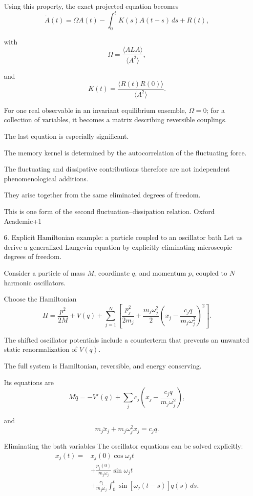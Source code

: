 Using this property, the exact projected equation becomes
\[
\boxed{
\dot A(t)
=
\Omega A(t)
-\int_0^t K(s)A(t-s)\,ds
+R(t),
}
\]

with
\[
\Omega=\frac{\langle ALA\rangle}{\langle A^2\rangle},
\]

and
\[
\boxed{
K(t)=\frac{\langle R(t)R(0)\rangle}
{\langle A^2\rangle}.
}
\]

For one real observable in an invariant equilibrium ensemble, \(\Omega=0\); for a collection of variables, it becomes a matrix describing reversible couplings.

The last equation is especially significant.

The memory kernel is determined by the autocorrelation of the fluctuating force.

The fluctuating and dissipative contributions therefore are not independent phenomenological additions.

They arise together from the same eliminated degrees of freedom.

This is one form of the second fluctuation–dissipation relation. 
Oxford Academic+1

6. Explicit Hamiltonian example: a particle coupled to an oscillator bath
Let us derive a generalized Langevin equation by explicitly eliminating microscopic degrees of freedom.

Consider a particle of mass \(M\), coordinate \(q\), and momentum \(p\), coupled to \(N\) harmonic oscillators.

Choose the Hamiltonian
\[
\boxed{
H=
\frac{p^2}{2M}+V(q)
+
\sum_{j=1}^N
\left[
\frac{p_j^2}{2m_j}
+
\frac{m_j\omega_j^2}{2}
\left(
x_j-\frac{c_jq}{m_j\omega_j^2}
\right)^2
\right].
}
\]

The shifted oscillator potentials include a counterterm that prevents an unwanted static renormalization of \(V(q)\).

The full system is Hamiltonian, reversible, and energy conserving.

Its equations are
\[
M\ddot q
=
-V'(q)
+\sum_j c_j
\left(x_j-\frac{c_jq}{m_j\omega_j^2}\right),
\]

and
\[
m_j\ddot x_j+m_j\omega_j^2x_j=c_jq.
\]

Eliminating the bath variables
The oscillator equations can be solved explicitly:
\[
\begin{aligned}
x_j(t)={}&x_j(0)\cos\omega_jt\\
&+\frac{p_j(0)}{m_j\omega_j}\sin\omega_jt\\
&+\frac{c_j}{m_j\omega_j}
\int_0^t\sin[\omega_j(t-s)]q(s)\,ds.
\end{aligned}
\]

